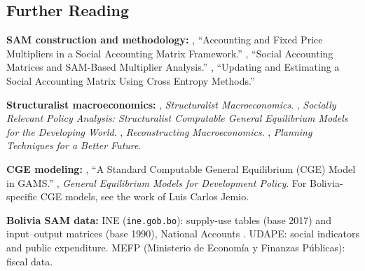 \documentclass[../structural_economics_book.tex]{subfiles}
\begin{document}
\subsection*{Further Reading}

\textbf{SAM construction and methodology:} \citet{pyatt1979accounting}, ``Accounting and Fixed Price Multipliers in a Social Accounting Matrix Framework.'' \citet{round2003social}, ``Social Accounting Matrices and SAM-Based Multiplier Analysis.'' \citet*{robinson2001updating}, ``Updating and Estimating a Social Accounting Matrix Using Cross Entropy Methods.''

\textbf{Structuralist macroeconomics:} \citet{taylor1983structuralist}, \textit{Structuralist Macroeconomics}. \citet{taylor1990socially}, \textit{Socially Relevant Policy Analysis: Structuralist Computable General Equilibrium Models for the Developing World}. \citet{taylor2004reconstructing}, \textit{Reconstructing Macroeconomics}. \citet{pyatt1976planning}, \textit{Planning Techniques for a Better Future}.

\textbf{CGE modeling:} \citet*{lofgren2002standard}, ``A Standard Computable General Equilibrium (CGE) Model in GAMS.'' \citet*{dervis1982general}, \textit{General Equilibrium Models for Development Policy}. For Bolivia-specific CGE models, see the work of Luis Carlos Jemio. %

\textbf{Bolivia SAM data:} INE (\texttt{ine.gob.bo}): supply-use tables (base 2017) and input--output matrices (base 1990), National Accounts \citep{ine2026sut}. UDAPE: social indicators and public expenditure. MEFP (Ministerio de Econom\'{i}a y Finanzas P\'{u}blicas): fiscal data.
\end{document}
